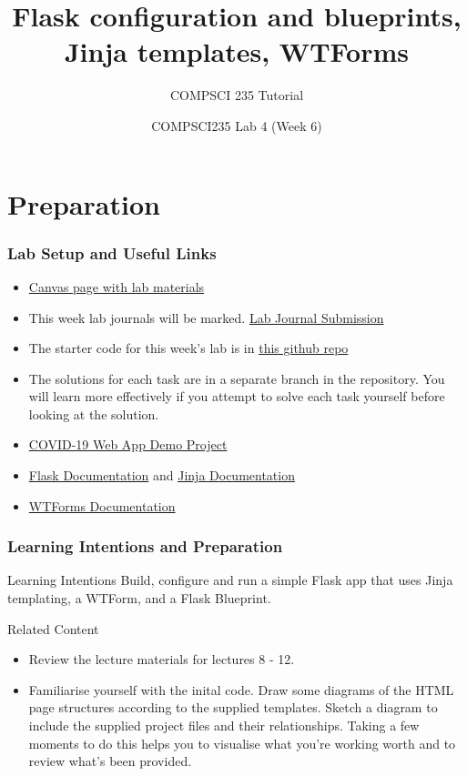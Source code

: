 \documentclass{beamer}
\title[COMPSCI235 Lab 4 (Week 6)]
{Flask configuration and blueprints, Jinja templates, WTForms}
\author{COMPSCI 235 Tutorial}
\date[July 2021]
{COMPSCI235 Lab 4 (Week 6)}
\begin{document}
	\frame{\titlepage}
	\section{Preparation}

	\begin{frame}
	  \frametitle{Lab Setup and Useful Links}
		\begin{itemize}
			\item \href{https://canvas.auckland.ac.nz/courses/60516/pages/lab-4-week-6-config-templates-blueprints-wtforms}{Canvas page with lab materials}
			\item This week lab journals will be marked. \href{https://canvas.auckland.ac.nz/courses/60516/assignments/246232}{Lab Journal Submission}
			\item The starter code for this week's lab is in \href{https://github.com/133caesium/COMPSCI-235-Lab-4-People/tree/lab4-task01-config}{this github repo}
			\item The solutions for each task are in a separate branch in the repository. You will learn more effectively if you attempt to solve each task yourself before looking at the solution.
			\item \href{https://github.com/martinurschler/2021CompSci235-03-CovidWebApp}{COVID-19 Web App Demo Project}
			\item \href{https://flask.palletsprojects.com/en/2.0.x/}{Flask Documentation} and \href{https://jinja.palletsprojects.com/en/3.0.x/}{Jinja Documentation}
			\item \href{https://wtforms.readthedocs.io/en/2.3.x/}{WTForms Documentation}
		\end{itemize}
	\end{frame}

	\begin{frame}
		\frametitle{Learning Intentions and Preparation}
		\begin{block}{Learning Intentions}
		Build, configure and run a simple Flask app that uses Jinja templating, a WTForm, and a Flask Blueprint.
		\end{block}
		\begin{block}{Related Content}
		\begin{itemize}
		\item Review the lecture materials for lectures 8 - 12.
		\item Familiarise yourself with the inital code. Draw some diagrams of the HTML page structures according to the supplied templates. Sketch a diagram to include the supplied project files and their relationships. Taking a few moments to do this helps you to visualise what you’re working worth and to review what’s been provided.
		\end{itemize}
		\end{block}
	\end{frame}
\end{document}
